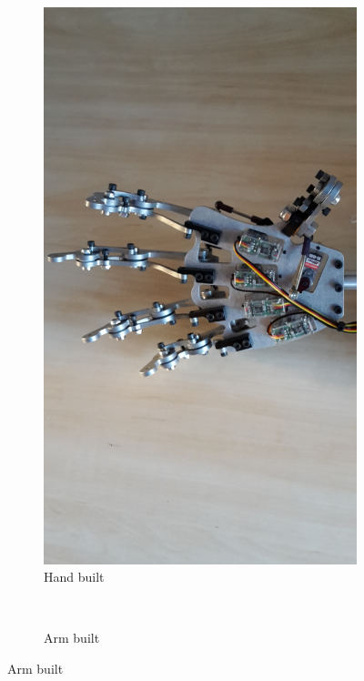 \documentclass[progress]{cmpreport}
\begin{document}
\begin{figure} [H]
\begin{subfigure}[h]{0.4\linewidth}
		\caption{Hand built}
		\includegraphics[trim=20cm 0cm 22cm 0cm, clip=true, totalheight=0.29\textheight, angle=-90]{photos/Day10.jpg}
	\end{subfigure} \\
	\hfill
	\begin{subfigure}[h]{0.4\linewidth}
		\caption{Arm built}

\end{subfigure}
\end{figure}
\end{document}
